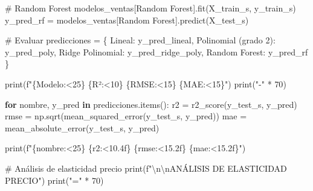 \documentclass[
  doc,
  floatsintext,
  longtable,
  a4paper,
  nolmodern,
  notxfonts,
  notimes,
  12pt,
  colorlinks=true,linkcolor=blue,citecolor=blue,urlcolor=blue]{apa7}
\newenvironment{Shaded}{\begin{snugshade}}{\end{snugshade}}
\newcommand{\BuiltInTok}[1]{\textcolor[rgb]{0.00,0.23,0.31}{#1}}
\newcommand{\CharTok}[1]{\textcolor[rgb]{0.13,0.47,0.30}{#1}}
\newcommand{\CommentTok}[1]{\textcolor[rgb]{0.37,0.37,0.37}{#1}}
\newcommand{\ControlFlowTok}[1]{\textcolor[rgb]{0.00,0.23,0.31}{\textbf{#1}}}
\newcommand{\DecValTok}[1]{\textcolor[rgb]{0.68,0.00,0.00}{#1}}
\newcommand{\KeywordTok}[1]{\textcolor[rgb]{0.00,0.23,0.31}{\textbf{#1}}}
\newcommand{\NormalTok}[1]{\textcolor[rgb]{0.00,0.23,0.31}{#1}}
\newcommand{\OperatorTok}[1]{\textcolor[rgb]{0.37,0.37,0.37}{#1}}
\newcommand{\SpecialCharTok}[1]{\textcolor[rgb]{0.37,0.37,0.37}{#1}}
\newcommand{\SpecialStringTok}[1]{\textcolor[rgb]{0.13,0.47,0.30}{#1}}
\newcommand{\StringTok}[1]{\textcolor[rgb]{0.13,0.47,0.30}{#1}}
\begin{document}
\begin{Shaded}
\begin{Highlighting}[]
\CommentTok{\# Random Forest}
\NormalTok{modelos\_ventas[}\StringTok{\textquotesingle{}Random Forest\textquotesingle{}}\NormalTok{].fit(X\_train\_s, y\_train\_s)}
\NormalTok{y\_pred\_rf }\OperatorTok{=}\NormalTok{ modelos\_ventas[}\StringTok{\textquotesingle{}Random Forest\textquotesingle{}}\NormalTok{].predict(X\_test\_s)}

\CommentTok{\# Evaluar}
\NormalTok{predicciones }\OperatorTok{=}\NormalTok{ \{}
    \StringTok{\textquotesingle{}Lineal\textquotesingle{}}\NormalTok{: y\_pred\_lineal,}
    \StringTok{\textquotesingle{}Polinomial (grado 2)\textquotesingle{}}\NormalTok{: y\_pred\_poly,}
    \StringTok{\textquotesingle{}Ridge Polinomial\textquotesingle{}}\NormalTok{: y\_pred\_ridge\_poly,}
    \StringTok{\textquotesingle{}Random Forest\textquotesingle{}}\NormalTok{: y\_pred\_rf}
\NormalTok{\}}

\BuiltInTok{print}\NormalTok{(}\SpecialStringTok{f"}\SpecialCharTok{\{}\StringTok{\textquotesingle{}Modelo\textquotesingle{}}\SpecialCharTok{:\textless{}25\}}\SpecialStringTok{ }\SpecialCharTok{\{}\StringTok{\textquotesingle{}R²\textquotesingle{}}\SpecialCharTok{:\textless{}10\}}\SpecialStringTok{ }\SpecialCharTok{\{}\StringTok{\textquotesingle{}RMSE\textquotesingle{}}\SpecialCharTok{:\textless{}15\}}\SpecialStringTok{ }\SpecialCharTok{\{}\StringTok{\textquotesingle{}MAE\textquotesingle{}}\SpecialCharTok{:\textless{}15\}}\SpecialStringTok{"}\NormalTok{)}
\BuiltInTok{print}\NormalTok{(}\StringTok{"{-}"} \OperatorTok{*} \DecValTok{70}\NormalTok{)}

\ControlFlowTok{for}\NormalTok{ nombre, y\_pred }\KeywordTok{in}\NormalTok{ predicciones.items():}
\NormalTok{    r2 }\OperatorTok{=}\NormalTok{ r2\_score(y\_test\_s, y\_pred)}
\NormalTok{    rmse }\OperatorTok{=}\NormalTok{ np.sqrt(mean\_squared\_error(y\_test\_s, y\_pred))}
\NormalTok{    mae }\OperatorTok{=}\NormalTok{ mean\_absolute\_error(y\_test\_s, y\_pred)}
    
    \BuiltInTok{print}\NormalTok{(}\SpecialStringTok{f"}\SpecialCharTok{\{}\NormalTok{nombre}\SpecialCharTok{:\textless{}25\}}\SpecialStringTok{ }\SpecialCharTok{\{}\NormalTok{r2}\SpecialCharTok{:\textless{}10.4f\}}\SpecialStringTok{ }\SpecialCharTok{\{}\NormalTok{rmse}\SpecialCharTok{:\textless{}15.2f\}}\SpecialStringTok{ }\SpecialCharTok{\{}\NormalTok{mae}\SpecialCharTok{:\textless{}15.2f\}}\SpecialStringTok{"}\NormalTok{)}

\CommentTok{\# Análisis de elasticidad precio}
\BuiltInTok{print}\NormalTok{(}\SpecialStringTok{f"}\CharTok{\textbackslash{}n\textbackslash{}n}\SpecialStringTok{ANÁLISIS DE ELASTICIDAD PRECIO"}\NormalTok{)}
\BuiltInTok{print}\NormalTok{(}\StringTok{"="} \OperatorTok{*} \DecValTok{70}\NormalTok{)}


\end{Highlighting}
\end{Shaded}
\end{document}
